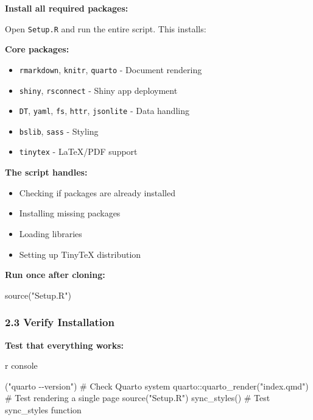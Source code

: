 \documentclass[
  letterpaper,
  DIV=11,
  numbers=noendperiod]{scrartcl}
\newenvironment{Shaded}{\begin{snugshade}}{\end{snugshade}}
\newcommand{\CommentTok}[1]{\textcolor[rgb]{0.37,0.37,0.37}{#1}}
\newcommand{\FunctionTok}[1]{\textcolor[rgb]{0.28,0.35,0.67}{#1}}
\newcommand{\NormalTok}[1]{\textcolor[rgb]{0.00,0.23,0.31}{#1}}
\newcommand{\SpecialCharTok}[1]{\textcolor[rgb]{0.37,0.37,0.37}{#1}}
\newcommand{\StringTok}[1]{\textcolor[rgb]{0.13,0.47,0.30}{#1}}
\begin{document}
\textbf{Install all required packages:}

Open \texttt{Setup.R} and run the entire script. This installs:

\textbf{Core packages:}

\begin{itemize}
\item
  \texttt{rmarkdown}, \texttt{knitr}, \texttt{quarto} - Document
  rendering
\item
  \texttt{shiny}, \texttt{rsconnect} - Shiny app deployment
\item
  \texttt{DT}, \texttt{yaml}, \texttt{fs}, \texttt{httr},
  \texttt{jsonlite} - Data handling
\item
  \texttt{bslib}, \texttt{sass} - Styling
\item
  \texttt{tinytex} - LaTeX/PDF support
\end{itemize}

\textbf{The script handles:}

\begin{itemize}
\item
  Checking if packages are already installed
\item
  Installing missing packages
\item
  Loading libraries
\item
  Setting up TinyTeX distribution
\end{itemize}

\textbf{Run once after cloning:}

\begin{Shaded}
\begin{Highlighting}[]
\FunctionTok{source}\NormalTok{(}\StringTok{"Setup.R"}\NormalTok{)}
\end{Highlighting}
\end{Shaded}

\subsubsection{2.3 Verify Installation}\label{verify-installation}

\textbf{Test that everything works:}

r console

\begin{Shaded}
\begin{Highlighting}[]
\NormalTok{(}\StringTok{"quarto {-}{-}version"}\NormalTok{) }\CommentTok{\# Check Quarto system}
\NormalTok{quarto}\SpecialCharTok{::}\FunctionTok{quarto\_render}\NormalTok{(}\StringTok{"index.qmd"}\NormalTok{) }\CommentTok{\# Test rendering a single page }
\FunctionTok{source}\NormalTok{(}\StringTok{"Setup.R"}\NormalTok{) }\FunctionTok{sync\_styles}\NormalTok{() }\CommentTok{\# Test sync\_styles function}
\end{Highlighting}
\end{Shaded}
\end{document}
